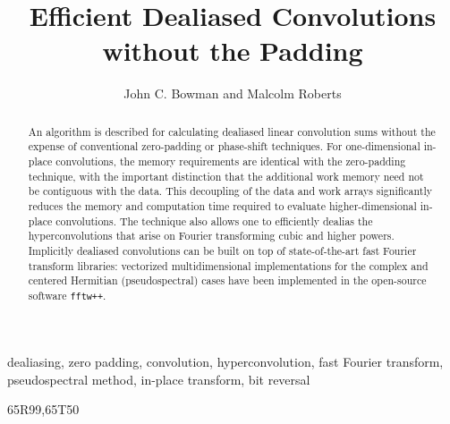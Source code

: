 \documentclass[final]{siamltex}
\begin{document}
\title{Efficient Dealiased Convolutions without the Padding}
\author{John C. Bowman and Malcolm Roberts}
\maketitle

\begin{abstract}
An algorithm is described for calculating dealiased linear convolution sums
without the expense of conventional zero-padding or phase-shift
techniques. For one-dimensional in-place convolutions, the memory
requirements are identical with the zero-padding technique, with the important
distinction that the additional work memory need not be contiguous with the
data. This decoupling of the data and work arrays significantly reduces
the memory and computation time required to evaluate higher-dimensional
in-place convolutions. The technique also allows one to efficiently dealias the
hyperconvolutions that arise on Fourier transforming cubic and higher powers.
Implicitly dealiased convolutions can be built on top of state-of-the-art
fast Fourier transform libraries: vectorized multidimensional implementations
for the complex and centered Hermitian (pseudospectral) cases have
been implemented in the open-source software {\tt fftw++}.
\end{abstract} 

\begin{keywords} 
dealiasing, zero padding, convolution, hyperconvolution, fast Fourier transform,
pseudospectral method, in-place transform, bit reversal
\end{keywords}

\begin{AMS}
65R99,65T50
\end{AMS}

\pagestyle{myheadings}



% 


%


%
\end{document}
